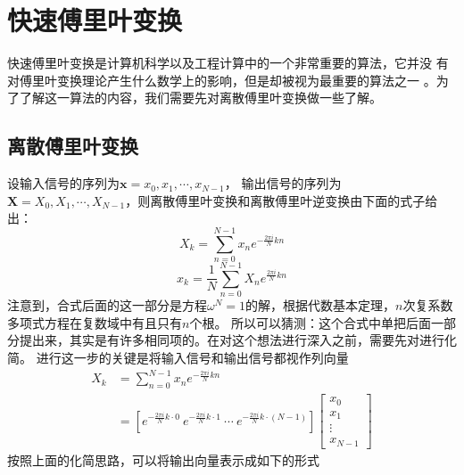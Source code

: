 \chapter{快速傅里叶变换}
    快速傅里叶变换是计算机科学以及工程计算中的一个非常重要的算法，它并没%
    有对傅里叶变换理论产生什么数学上的影响，但是却被视为最重要的算法之一%
    。为了了解这一算法的内容，我们需要先对离散傅里叶变换做一些了解。
    \section{离散傅里叶变换}
        设输入信号的序列为$\textbf{x} = {x_0, x_1, \cdots, x_{N - 1}}$， 输出信号的序列为$\textbf{X} = {X_0, X_1, \cdots, X_{N - 1}}$，则离散傅里叶变换和离散傅里叶逆变换由下面的式子给出：
        \begin{equation}
            X_k = \sum_{n = 0}^{N - 1} x_n e^{-\frac{2\pi i}{N}kn}
            \label{eq: 4.1}
        \end{equation}
        \begin{equation}
            x_k = \dfrac 1 N \sum_{n = 0}^{N - 1} X_n e^{\frac{2\pi i}{N}kn}
            \label{eq: 4.2}
        \end{equation}
        注意到，合式后面的这一部分是方程$\omega^N = 1$的解，根据代数基本定理，$n$次复系数多项式方程在复数域中有且只有$n$个根。%
        所以可以猜测：这个合式中单把后面一部分提出来，其实是有许多相同项的。在对这个想法进行深入之前，需要先对进行化简。%
        进行这一步的关键是将输入信号和输出信号都视作列向量
        \begin{equation*}
            \begin{split}
                X_k &= \sum_{n = 0}^{N - 1} x_n e^{-\frac{2\pi i}{N}kn}\\
                &= [e^{-\frac{2\pi i}{N}k\cdot 0}\  e^{-\frac{2\pi i}{N}k\cdot 1}\  \cdots\  e^{-\frac{2\pi i}{N}k\cdot (N - 1)}]
                \left[\begin{matrix}
                    x_0\\
                    x_1\\
                    \vdots\\
                    x_{N - 1}
                \end{matrix}\right]
            \end{split}
        \end{equation*}
        按照上面的化简思路，可以将输出向量表示成如下的形式
